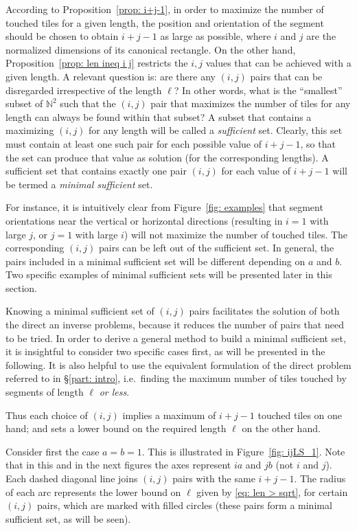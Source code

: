 \documentclass[12pt, a4paper]{article}
\newcommand{\len}{\ell} %
\begin{document}
According to Proposition~\ref{prop: i+j-1}, in order to maximize the number of touched tiles for a given length, the position and orientation of the segment should be chosen to obtain $i+j-1$ as large as possible, where $i$ and $j$ are the normalized dimensions of its canonical rectangle. On the other hand, Proposition~\ref{prop: len ineq i j} restricts the $i, j$ values that can be achieved with a given length. A relevant question is: are there any $(i,j)$ pairs that can be disregarded irrespective of the length $\len$? In other words, what is the ``smallest'' subset of $\mathbb N^2$ such that the $(i,j)$ pair that maximizes the number of tiles for any length can always be found within that subset? A subset that contains a maximizing $(i,j)$ for any length will be called a \emph{sufficient} set. Clearly, this set must contain at least one such pair for each possible value of $i+j-1$, so that the set can produce that value as solution (for the corresponding lengths). A sufficient set that contains exactly one pair $(i,j)$ for each value of $i+j-1$ will be termed a \emph{minimal sufficient} set.

For instance, it is intuitively clear from Figure~\ref{fig: examples} that segment orientations near the vertical or horizontal directions (resulting in $i=1$ with large $j$, or $j=1$ with large $i$) will not maximize the number of touched tiles.
The corresponding $(i,j)$ pairs can be left out of the sufficient set. In general, the pairs included in a minimal sufficient set will be different depending on $a$ and $b$. Two specific examples of minimal sufficient sets will be presented later in this section.

Knowing a minimal sufficient set of $(i,j)$ pairs facilitates the solution of both the direct an inverse problems, because it reduces the number of pairs that need to be tried. In order to derive a general method to build a minimal sufficient set, it is insightful to consider two specific cases first, as will be presented in the following. It is also helpful to use the equivalent formulation of the direct problem referred to in \S\ref{part: intro}, i.e.\ finding the maximum number of tiles touched by segments of length $\len$ \emph{or less}.

Thus each choice of $(i, j)$ implies a maximum of $i+j-1$ touched tiles on one hand; and sets a lower bound on the required length $\len$ on the other hand.

Consider first the case $a=b=1$. This is illustrated in Figure~\ref{fig: ijLS_1}. Note that in this and in the next figures the axes represent $ia$ and $jb$ (not $i$ and $j$). Each dashed diagonal line joins $(i, j)$ pairs with the same $i+j-1$. The radius of each arc represents the lower bound on $\len$ given by \eqref{eq: len > sqrt}, for certain $(i,j)$ pairs, which are marked with filled circles (these pairs form a minimal sufficient set, as will be seen).
\end{document}
